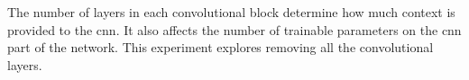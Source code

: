 
The number of layers in each convolutional block determine
how much context is provided to the \gls{cnn}. It also
affects the number of trainable parameters on the \gls{cnn}
part of the network. This experiment explores removing all
the convolutional layers.

